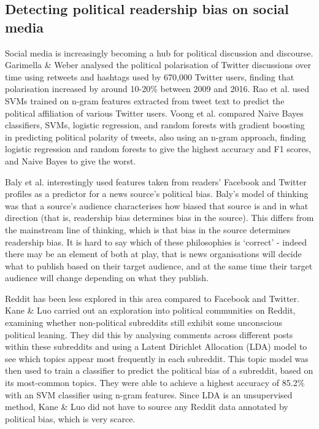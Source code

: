 \subsection{Detecting political readership bias on social media} \label{subsec:readership-bias-social-media}

Social media is increasingly becoming a hub for political discussion and discourse. Garimella \& Weber \cite{garimella} analysed the political polarisation of Twitter discussions over time using retweets and hashtags used by 670,000 Twitter users, finding that polarisation increased by around 10-20\% between 2009 and 2016. Rao et al. \cite{rao} used SVMs trained on n-gram features extracted from tweet text to predict the political affiliation of various Twitter users. Voong et al. \cite{voong} compared Naive Bayes classifiers, SVMs, logistic regression, and random forests with gradient boosting in predicting political polarity of tweets, also using an n-gram approach, finding logistic regression and random forests to give the highest accuracy and F1 scores, and Naive Bayes to give the worst.

Baly et al. \cite{baly-acl2020} interestingly used features taken from readers' Facebook and Twitter profiles as a predictor for a news source's political bias. Baly's model of thinking was that a source's audience characterises how biased that source is and in what direction (that is, readership bias determines bias in the source). This differs from the mainstream line of thinking, which is that bias in the source determines readership bias. It is hard to say which of these philosophies is `correct' - indeed there may be an element of both at play, that is news organisations will decide what to publish based on their target audience, and at the same time their target audience will change depending on what they publish.

Reddit has been less explored in this area compared to Facebook and Twitter. Kane \& Luo \cite{kane} carried out an exploration into political communities on Reddit, examining whether non-political subreddits still exhibit some unconscious political leaning. They did this by analysing comments across different posts within these subreddits and using a Latent Dirichlet Allocation (LDA) model to see which topics appear most frequently in each subreddit. This topic model was then used to train a classifier to predict the political bias of a subreddit, based on its most-common topics. They were able to achieve a highest accuracy of 85.2\% with an SVM classifier using n-gram features. Since LDA is an unsupervised method, Kane \& Luo did not have to source any Reddit data annotated by political bias, which is very scarce.

